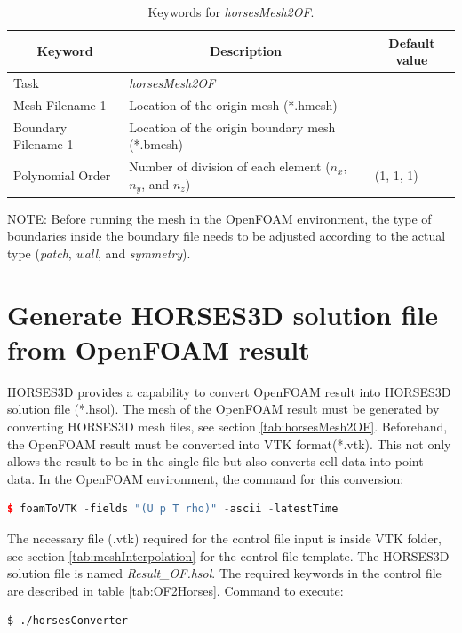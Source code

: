 \documentclass[a4paper,10pt]{report}
\begin{document}
\begin{longtable}{|p{4cm}|p{10cm}|p{2.2cm}|}
\caption{Keywords for \textit{horsesMesh2OF}.} \label{tab:horsesMesh2of} \\
\hline
\multicolumn{1}{|c|}{\textbf{Keyword}} & \multicolumn{1}{c|}{\textbf{Description}} & \multicolumn{1}{c|}{\textbf{Default value}} \\ \hline
\endfirsthead

Task 	        		& \textit{horsesMesh2OF} 						&  \\ \hline
Mesh Filename 1 		& Location of the origin mesh (*.hmesh) 	&  \\ \hline
Boundary Filename 1 	& Location of the origin boundary mesh (*.bmesh) 	&  \\ \hline
Polynomial Order 	& Number of division of each element ($n_x$, $n_y$, and $n_z$) 	& (1, 1, 1) \\ \hline
\end{longtable}

NOTE: Before running the mesh in the OpenFOAM environment, the type of boundaries inside the boundary file needs to be adjusted according to the actual type (\textit{patch}, \textit{wall}, and \textit{symmetry}).

\section{Generate HORSES3D solution file from OpenFOAM result}
HORSES3D provides a capability to convert OpenFOAM result into HORSES3D solution file (*.hsol). The mesh of the OpenFOAM result must be generated by converting HORSES3D mesh files, see section \ref{tab:horsesMesh2OF}. Beforehand, the OpenFOAM result must be converted into VTK format(*.vtk). This not only  allows the result to be in the single file but also converts cell data into point data. In the OpenFOAM environment, the command for this conversion:  
\begin{lstlisting}[language=c++]
	$ foamToVTK -fields "(U p T rho)" -ascii -latestTime
\end{lstlisting}
The necessary file (.vtk) required for the control file input is inside VTK folder, see section \ref{tab:meshInterpolation} for the control file template. The HORSES3D solution file is named \emph{Result\_OF.hsol}. The required keywords in the control file are described in table \ref{tab:OF2Horses}. Command to execute:

\begin{lstlisting}[language=bash]
	$ ./horsesConverter
\end{lstlisting}
\end{document}
